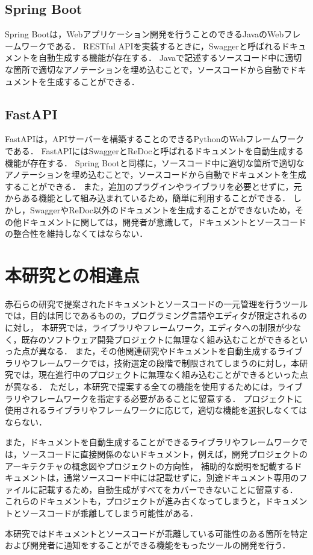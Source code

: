\subsection{Spring Boot}
Spring Boot\cite{spring}は，Webアプリケーション開発を行うことのできるJavaのWebフレームワークである．
RESTful APIを実装するときに，Swagger\cite{swagger}と呼ばれるドキュメントを自動生成する機能が存在する．
Javaで記述するソースコード中に適切な箇所で適切なアノテーションを埋め込むことで，ソースコードから自動でドキュメントを生成することができる．

\subsection{FastAPI}
FastAPI\cite{fastapi}は，APIサーバーを構築することのできるPythonのWebフレームワークである．
FastAPIにはSwaggerとReDoc\cite{redoc}と呼ばれるドキュメントを自動生成する機能が存在する．
Spring Bootと同様に，ソースコード中に適切な箇所で適切なアノテーションを埋め込むことで，ソースコードから自動でドキュメントを生成することができる．
また，追加のプラグインやライブラリを必要とせずに，元からある機能として組み込まれているため，簡単に利用することができる．
しかし，SwaggerやReDoc以外のドキュメントを生成することができないため，その他ドキュメントに関しては，開発者が意識して，ドキュメントとソースコードの整合性を維持しなくてはならない．

\section{本研究との相違点}
赤石らの研究で提案されたドキュメントとソースコードの一元管理を行うツールでは，目的は同じであるものの，プログラミング言語やエディタが限定されるのに対し，
本研究では，ライブラリやフレームワーク，エディタへの制限が少なく，既存のソフトウェア開発プロジェクトに無理なく組み込むことができるといった点が異なる．
また，その他関連研究やドキュメントを自動生成するライブラリやフレームワークでは，技術選定の段階で制限されてしまうのに対し，本研究では，現在進行中のプロジェクトに無理なく組み込むことができるといった点が異なる．
ただし，本研究で提案する全ての機能を使用するためには，ライブラリやフレームワークを指定する必要があることに留意する．
プロジェクトに使用されるライブラリやフレームワークに応じて，適切な機能を選択しなくてはならない．

また，ドキュメントを自動生成することができるライブラリやフレームワークでは，ソースコードに直接関係のないドキュメント，例えば，開発プロジェクトのアーキテクチャの概念図やプロジェクトの方向性，
補助的な説明を記載するドキュメントは，通常ソースコード中には記載せずに，別途ドキュメント専用のファイルに記載するため，自動生成がすべてをカバーできないことに留意する．
これらのドキュメントも，プロジェクトが進み古くなってしまうと，ドキュメントとソースコードが乖離してしまう可能性がある．

本研究ではドキュメントとソースコードが乖離している可能性のある箇所を特定および開発者に通知をすることができる機能をもったツールの開発を行う．
